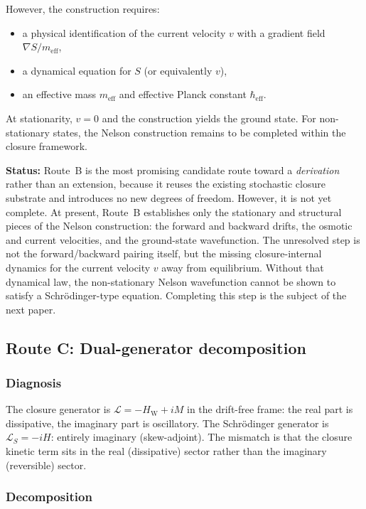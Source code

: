 \documentclass[12pt]{article}
\newcommand{\Lcal}{\mathcal{L}}
\begin{document}
However, the construction requires:
\begin{itemize}
    \item a physical identification of the current velocity $v$ with a gradient field $\nabla S / m_{\mathrm{eff}}$,
    \item a dynamical equation for $S$ (or equivalently $v$),
    \item an effective mass $m_{\mathrm{eff}}$ and effective Planck constant $\hbar_{\mathrm{eff}}$.
\end{itemize}

At stationarity, $v = 0$ and the construction yields the ground state. For non-stationary states, the Nelson construction remains to be completed within the closure framework.

\textbf{Status:} Route~B is the most promising candidate route toward a \textit{derivation} rather than an extension, because it reuses the existing stochastic closure substrate and introduces no new degrees of freedom. However, it is not yet complete. At present, Route~B establishes only the stationary and structural pieces of the Nelson construction: the forward and backward drifts, the osmotic and current velocities, and the ground-state wavefunction. The unresolved step is not the forward/backward pairing itself, but the missing closure-internal dynamics for the current velocity $v$ away from equilibrium. Without that dynamical law, the non-stationary Nelson wavefunction cannot be shown to satisfy a Schr\"odinger-type equation. Completing this step is the subject of the next paper.

\subsection{Route C: Dual-generator decomposition}\label{sec:routeC}

\subsubsection*{Diagnosis}

The closure generator is $\Lcal = -H_{\mathrm{W}} + iM$ in the drift-free frame: the real part is dissipative, the imaginary part is oscillatory. The Schr\"odinger generator is $\Lcal_S = -iH$: entirely imaginary (skew-adjoint). The mismatch is that the closure kinetic term sits in the real (dissipative) sector rather than the imaginary (reversible) sector.

\subsubsection*{Decomposition}
\end{document}
